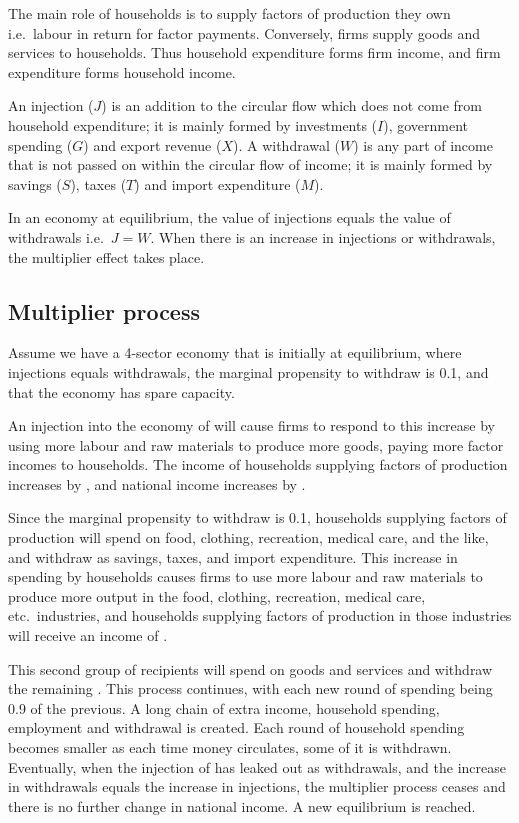 \documentclass[Economics.tex]{subfiles}
\begin{document}
The main role of households is to supply factors of production they own i.e.\ labour in return for factor payments. Conversely, firms supply goods and services to households. Thus household expenditure forms firm income, and firm expenditure forms household income.

An injection (\(J\)) is an addition to the circular flow which does not come from household expenditure; it is mainly formed by investments (\(I\)), government spending (\(G\)) and export revenue (\(X\)). A withdrawal (\(W\)) is any part of income that is not passed on within the circular flow of income; it is mainly formed by savings (\(S\)), taxes (\(T\)) and import expenditure (\(M\)).

In an economy at equilibrium, the value of injections equals the value of withdrawals i.e.\ \(J = W\). When there is an increase in injections or withdrawals, the multiplier effect takes place.
\subsection{Multiplier process}\label{s:6.mult}
Assume we have a 4-sector economy that is initially at equilibrium, where injections equals withdrawals, the marginal propensity to withdraw is \num{0.1}, and that the economy has spare capacity.

An injection into the economy of  will cause firms to respond to this increase by using more labour and raw materials to produce more goods, paying more factor incomes to households. The income of households supplying factors of production increases by , and national income increases by .

Since the marginal propensity to withdraw is \num{0.1}, households supplying factors of production will spend  on food, clothing, recreation, medical care, and the like, and withdraw  as savings, taxes, and import expenditure. This increase in spending by households causes firms to use more labour and raw materials to produce more output in the food, clothing, recreation, medical care, etc.\ industries, and households supplying factors of production in those industries will receive an income of .

This second group of recipients will spend  on goods and services and withdraw the remaining . This process continues, with each new round of spending being \num{0.9} of the previous. A long chain of extra income, household spending, employment and withdrawal is created. Each round of household spending becomes smaller as each time money circulates, some of it is withdrawn. Eventually, when the injection of  has leaked out as withdrawals, and the increase in withdrawals equals the increase in injections, the multiplier process ceases and there is no further change in national income. A new equilibrium is reached.
\end{document}
